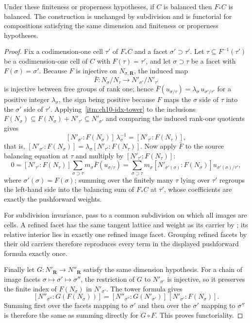 \begin{proposition}
\label{prop:tropical-pushforward-balanced}
Under these finiteness or properness hypotheses, if $C$ is balanced then
$F_*C$ is balanced. The construction is unchanged
by subdivision and is functorial for compositions satisfying the same
dimension and finiteness or properness hypotheses.
\end{proposition}
\begin{proof}
Fix a codimension-one cell $\tau'$ of $F_*C$ and a facet
$\sigma'\supset\tau'$.  Let $\tau\subseteq F^{-1}(\tau')$ be a
codimension-one cell of $C$ with $F(\tau)=\tau'$, and let
$\sigma\supset\tau$ be a facet with $F(\sigma)=\sigma'$.  Because $F$ is
injective on $N_{\sigma,\mathbf R}$, the induced map
\[
 \bar F:N_\sigma/N_\tau\longrightarrow N'_{\sigma'}/N'_{\tau'}
\]
is injective between free groups of rank one; hence
$\bar F(u_{\sigma/\tau})=\lambda_{\sigma}\,u_{\sigma'/\tau'}$ for a positive
integer $\lambda_\sigma$, the sign being positive because $F$ maps the
$\sigma$ side of $\tau$ into the $\sigma'$ side of $\tau'$.  Applying
\,\cref{itm:ch10-idx-tower} to the inclusions
$F(N_\sigma)\subseteq F(N_\sigma)+N'_{\tau'}\subseteq N'_{\sigma'}$ and
comparing the induced rank-one quotients gives
\[
 [N'_{\sigma'}:F(N_\sigma)]\,\lambda_\sigma^{-1}
 =[N'_{\tau'}:F(N_\tau)],
\]
that is, $[N'_{\sigma'}:F(N_\sigma)]=\lambda_\sigma[N'_{\tau'}:F(N_\tau)]$.
Now apply $\bar F$ to the source balancing equation at $\tau$ and multiply by
$[N'_{\tau'}:F(N_\tau)]$:
\[
 0=[N'_{\tau'}:F(N_\tau)]\sum_{\sigma\supset\tau}m_\sigma
     \bar F(u_{\sigma/\tau})
  =\sum_{\sigma\supset\tau}m_\sigma
     [N'_{\sigma'(\sigma)}:F(N_\sigma)]
       u_{\sigma'(\sigma)/\tau'},
\]
where $\sigma'(\sigma)=F(\sigma)$; summing over the finitely many $\tau$
lying over $\tau'$ regroups the left-hand side into the balancing sum of
$F_*C$ at $\tau'$, whose coefficients are exactly the pushforward weights.

For subdivision invariance, pass to a common subdivision on which all images
are cells.  A refined facet has the same tangent lattice and weight as its
carrier by ; its relative interior lies
in exactly one refined image facet.  Grouping refined facets by their old
carriers therefore reproduces every term in the displayed pushforward
formula exactly once.

Finally let $G:N'_{\mathbf R}\to N''_{\mathbf R}$ satisfy the same dimension
hypothesis.  For a chain of image facets
$\sigma\mapsto\sigma'\mapsto\sigma''$, the restriction of $G$ to
$N'_{\sigma'}$ is injective, so it preserves the finite index of
$F(N_\sigma)$ in $N'_{\sigma'}$.  The tower formula gives
\[
 [N''_{\sigma''}:G(F(N_\sigma))]
 =[N''_{\sigma''}:G(N'_{\sigma'})]\,
   [N'_{\sigma'}:F(N_\sigma)].
\]
Summing first over the facets mapping to $\sigma'$ and then over the
$\sigma'$ mapping to $\sigma''$ is therefore the same as summing directly
for $G\circ F$.  This proves functoriality.
\end{proof}

